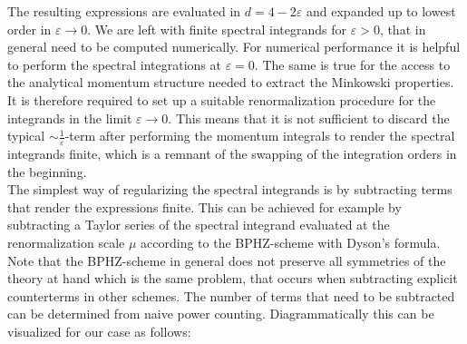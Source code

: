 The resulting expressions are evaluated in $d=4-2\varepsilon$ and expanded up to lowest order in $\varepsilon\rightarrow 0$. We are left with finite spectral integrands for $\varepsilon >0$, that in general need to be computed numerically. For numerical performance it is helpful to perform the spectral integrations at $\varepsilon=0$. The same is true for the access to the analytical momentum structure needed to extract the Minkowski properties. It is therefore required to set up a suitable renormalization procedure for the integrands in the limit $\varepsilon\rightarrow 0$. This means that it is not sufficient to discard the typical $\sim\frac{1}{\varepsilon}$-term after performing the momentum integrals to render the spectral integrands finite, which is a remnant of the swapping of the integration orders in the beginning. \\
The simplest way of regularizing the spectral integrands is by subtracting terms that render the expressions finite. This can be achieved for example by subtracting a Taylor series of the spectral integrand evaluated at the renormalization scale $\mu$ according to the BPHZ-scheme with Dyson's formula. \\
Note that the BPHZ-scheme in general does not preserve all symmetries of the theory at hand which is the same problem, that occurs when subtracting explicit counterterms in other schemes. The number of terms that need to be subtracted can be determined from naive power counting. Diagrammatically this can be visualized for our case as follows:
